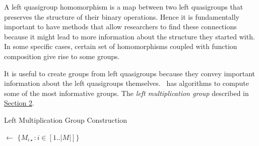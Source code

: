 \documentclass{mcom-l}
\begin{document}
\noindent A left quasigroup homomorphism is a map between two left quasigroups that preserves the structure of their binary operations. Hence it is fundamentally important to have methods that allow researchers to find these connections because it might lead to more information about the structure they started with. 
In some specific cases, certain set of homomorphisms coupled with function composition give rise to some groups. 

\noindent It is useful to create groups from left quasigroups because they convey important information about the left quasigroups themselves. \Software~has algorithms to compute some of the most informative groups.\newline\newline
\noindent The \emph{left multiplication group} described in \hyperref[leftmultiplicationgroup]{Section 2}.

\begin{algorithm}[H]
\DontPrintSemicolon
\caption{Left Multiplication Group Construction}
\BlankLine
\BlankLine
{}
\Ls $\leftarrow$ $\{ M_{i\star} : i \in [1..|M|]\}$\;
\;
\end{algorithm}
\end{document}

